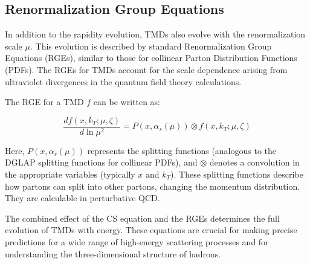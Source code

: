 \documentclass{article}
\begin{document}
\subsection{Renormalization Group Equations}

In addition to the rapidity evolution, TMDs also evolve with the renormalization scale $\mu$. This evolution is described by standard Renormalization
Group Equations (RGEs), similar to those for collinear Parton Distribution Functions (PDFs). The RGEs for TMDs account for the scale dependence
arising from ultraviolet divergences in the quantum field theory calculations.

The RGE for a TMD $f$ can be written as:

\begin{equation}
  \frac{d f(x, k_T; \mu, \zeta)}{d \ln \mu^2} = P(x, \alpha_s(\mu)) \otimes f(x, k_T; \mu, \zeta)
  \label{eq:RGE}
\end{equation}

Here, $P(x, \alpha_s(\mu))$ represents the splitting functions (analogous to the DGLAP splitting functions for collinear PDFs), and $\otimes$ denotes
a convolution in the appropriate variables (typically $x$ and $k_T$). These splitting functions describe how partons can split into other partons,
changing the momentum distribution. They are calculable in perturbative QCD.\@

The combined effect of the CS equation and the RGEs determines the full evolution of TMDs with energy. These equations are crucial for making precise
predictions for a wide range of high-energy scattering processes and for understanding the three-dimensional structure of hadrons.



\end{document}
